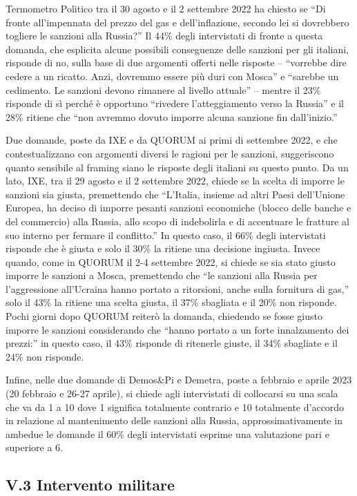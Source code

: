 \documentclass[
  openany]{book}
\begin{document}
Termometro Politico tra il 30 agosto e il 2 settembre 2022 ha chiesto se ``Di fronte all'impennata del prezzo del gas e dell'inflazione, secondo lei si dovrebbero togliere le sanzioni alla Russia?'' Il 44\% degli intervistati di fronte a questa domanda, che esplicita alcune possibili conseguenze delle sanzioni per gli italiani, risponde di no, sulla base di due argomenti offerti nelle risposte -- ``vorrebbe dire cedere a un ricatto. Anzi, dovremmo essere più duri con Mosca'' e ``sarebbe un cedimento. Le sanzioni devono rimanere al livello attuale'' -- mentre il 23\% risponde di sì perché è opportuno ``rivedere l'atteggiamento verso la Russia'' e il 28\% ritiene che ``non avremmo dovuto imporre alcuna sanzione fin dall'inizio.''

Due domande, poste da IXE e da QUORUM ai primi di settembre 2022, e che contestualizzano con argomenti diversi le ragioni per le sanzioni, suggeriscono quanto sensibile al framing siano le risposte degli italiani su questo punto. Da un lato, IXE, tra il 29 agosto e il 2 settembre 2022, chiede se la scelta di imporre le sanzioni sia giusta, premettendo che ``L'Italia, insieme ad altri Paesi dell'Unione Europea, ha deciso di imporre pesanti sanzioni economiche (blocco delle banche e del commercio) alla Russia, allo scopo di indebolirla e di accentuare le fratture al suo interno per fermare il conflitto.'' In questo caso, il 66\% degli intervistati risponde che è giusta e solo il 30\% la ritiene una decisione ingiusta. Invece quando, come in QUORUM il 2-4 settembre 2022, si chiede se sia stato giusto imporre le sanzioni a Mosca, premettendo che ``le sanzioni alla Russia per l'aggressione all'Ucraina hanno portato a ritorsioni, anche sulla fornitura di gas,'' solo il 43\% la ritiene una scelta giusta, il 37\% sbagliata e il 20\% non risponde. Pochi giorni dopo QUORUM reiterò la domanda, chiedendo se fosse giusto imporre le sanzioni considerando che ``hanno portato a un forte innalzamento dei prezzi:'' in questo caso, il 43\% risponde di ritenerle giuste, il 34\% sbagliate e il 24\% non risponde.

Infine, nelle due domande di Demos\&Pi e Demetra, poste a febbraio e aprile 2023 (20 febbraio e 26-27 aprile), si chiede agli intervistati di collocarsi su una scala che va da 1 a 10 dove 1 significa totalmente contrario e 10 totalmente d'accordo in relazione al mantenimento delle sanzioni alla Russia, approssimativamente in ambedue le domande il 60\% degli intervistati esprime una valutazione pari e superiore a 6.

\hypertarget{v.3-intervento-militare}{%
\subsection{V.3 Intervento militare}\label{v.3-intervento-militare}}
\end{document}
